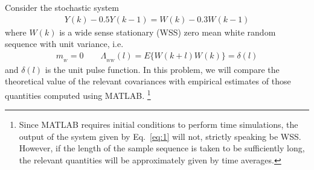 \item
Consider the stochastic system
\begin{align}
    \label{eq:1}
    Y(k) - 0.5 Y(k-1) = W(k) - 0.3 W(k-1)
\end{align}
where $W(k)$ is a wide sense stationary (WSS) zero mean white random sequence with unit variance, i.e.
\begin{align*}
    m_{_W} = 0 \hspace{2em} \Lambda_{_{WW}}(l)  = E\{W(k+l)W(k)\} = \delta(l)
\end{align*}
and $\delta(l)$ is the unit pulse function. In this problem, we will compare the theoretical value of the relevant covariances with empirical estimates of those quantities computed using MATLAB.
\footnote{Since MATLAB requires initial conditions to perform time simulations, the output of the system given by Eq.~\eqref{eq:1} will not, strictly speaking be WSS. However, if the length of the sample sequence is taken to be sufficiently long, the relevant quantities will be approximately given by time averages.}

